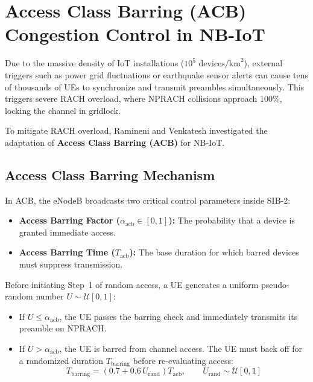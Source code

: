 \section{Access Class Barring (ACB) Congestion Control in NB-IoT}
\label{sec:nbiot_acb}

Due to the massive density of IoT installations ($10^5\text{~devices/km}^2$), external triggers such as power grid fluctuations or earthquake sensor alerts can cause tens of thousands of UEs to synchronize and transmit preambles simultaneously. This triggers severe RACH overload, where NPRACH collisions approach $100\%$, locking the channel in gridlock.

To mitigate RACH overload, Ramineni and Venkatesh \cite{ramineni2019impact} investigated the adaptation of \textbf{Access Class Barring (ACB)} for NB-IoT.

\subsection{Access Class Barring Mechanism}
In ACB, the eNodeB broadcasts two critical control parameters inside SIB-2:
\begin{itemize}
    \item \textbf{Access Barring Factor ($\alpha_{\text{acb}} \in [0, 1]$):} The probability that a device is granted immediate access.
    \item \textbf{Access Barring Time ($T_{\text{acb}}$):} The base duration for which barred devices must suppress transmission.
\end{itemize}

Before initiating Step~1 of random access, a UE generates a uniform pseudo-random number $U \sim \mathcal{U}[0, 1]$:
\begin{itemize}
    \item If $U \le \alpha_{\text{acb}}$, the UE passes the barring check and immediately transmits its preamble on NPRACH.
    \item If $U > \alpha_{\text{acb}}$, the UE is barred from channel access. The UE must back off for a randomized duration $T_{\text{barring}}$ before re-evaluating access:
    \begin{equation}
        T_{\text{barring}} = \left( 0.7 + 0.6 \, U_{\text{rand}} \right) T_{\text{acb}}, \qquad U_{\text{rand}} \sim \mathcal{U}[0, 1]
    \end{equation}
\end{itemize}

